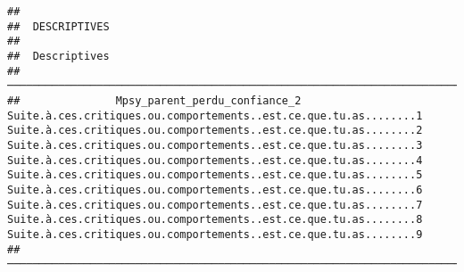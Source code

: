 \documentclass[
]{article}
\begin{document}
\begin{verbatim}
## 
##  DESCRIPTIVES
## 
##  Descriptives                                                                                                                                                                                                                                                                                                                                                                                                                                                                                                                                                                                                                                                                              
##  ───────────────────────────────────────────────────────────────────────────────────────────────────────────────────────────────────────────────────────────────────────────────────────────────────────────────────────────────────────────────────────────────────────────────────────────────────────────────────────────────────────────────────────────────────────────────────────────────────────────────────────────────────────────────────────────────────────────────────────────────────────────────────────────────────────────────────────────────────────────────────────────────────────────────────────────────────────────────────────────────────────────────────────── 
##               Mpsy_parent_perdu_confiance_2    Suite.à.ces.critiques.ou.comportements..est.ce.que.tu.as........1    Suite.à.ces.critiques.ou.comportements..est.ce.que.tu.as........2    Suite.à.ces.critiques.ou.comportements..est.ce.que.tu.as........3    Suite.à.ces.critiques.ou.comportements..est.ce.que.tu.as........4    Suite.à.ces.critiques.ou.comportements..est.ce.que.tu.as........5    Suite.à.ces.critiques.ou.comportements..est.ce.que.tu.as........6    Suite.à.ces.critiques.ou.comportements..est.ce.que.tu.as........7    Suite.à.ces.critiques.ou.comportements..est.ce.que.tu.as........8    Suite.à.ces.critiques.ou.comportements..est.ce.que.tu.as........9   
##  ───────────────────────────────────────────────────────────────────────────────────────────────────────────────────────────────────────────────────────────────────────────────────────────────────────────────────────────────────────────────────────────────────────────────────────────────────────────────────────────────────────────────────────────────────────────────────────────────────────────────────────────────────────────────────────────────────────────────────────────────────────────────────────────────────────────────────────────────────────────────────────────────────────────────────────────────────────────────────────────────────────────────────────── 

\end{verbatim}
\end{document}
